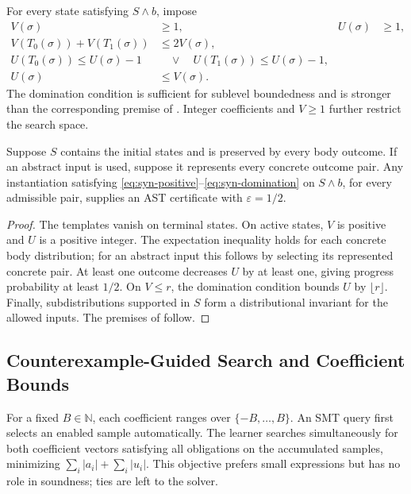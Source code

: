 For every state satisfying $S\land b$, impose
\begin{align}
 V(\sigma)&\geq1,& U(\sigma)&\geq1,
 \label{eq:syn-positive}\\
 V(T_0(\sigma))+V(T_1(\sigma))&\leq2V(\sigma),
 \label{eq:syn-supermartingale}\\
 U(T_0(\sigma))\leq U(\sigma)-1
 &\quad\lor\quad U(T_1(\sigma))\leq U(\sigma)-1,
 \label{eq:syn-progress}\\
 U(\sigma)&\leq V(\sigma).
 \label{eq:syn-domination}
\end{align}
The domination condition is sufficient for sublevel boundedness and is
stronger than the corresponding premise of .
Integer coefficients and $V\geq1$ further restrict the search space.

\begin{proposition}
\label{prop:synthesis-soundness}
Suppose $S$ contains the initial states and is preserved by every body
outcome. If an abstract input is used, suppose it represents every
concrete outcome pair. Any instantiation satisfying
\eqref{eq:syn-positive}--\eqref{eq:syn-domination} on $S\land b$,
for every admissible pair, supplies an AST certificate with
$\varepsilon=1/2$.
\end{proposition}
\begin{proof}
The templates vanish on terminal states. On active states, $V$ is positive
and $U$ is a positive integer. The expectation inequality holds for each
concrete body distribution; for an abstract input this follows by selecting
its represented concrete pair. At least one outcome decreases $U$ by at
least one, giving progress probability at least $1/2$. On $V\leq r$, the
domination condition bounds $U$ by $\lfloor r\rfloor$. Finally,
subdistributions supported in $S$ form a distributional invariant for the
allowed inputs. The premises of  follow.
\end{proof}

\subsection{Counterexample-Guided Search and Coefficient Bounds}
\label{sec:synthesis-cegis}

For a fixed $B\in\mathbb{N}$, each coefficient ranges over
$\{-B,\ldots,B\}$. An SMT query first selects an enabled sample
automatically. The learner searches simultaneously for both coefficient
vectors satisfying all obligations on the accumulated samples, minimizing
$\sum_i|a_i|+\sum_i|u_i|$. This objective prefers small expressions but
has no role in soundness; ties are left to the solver.


